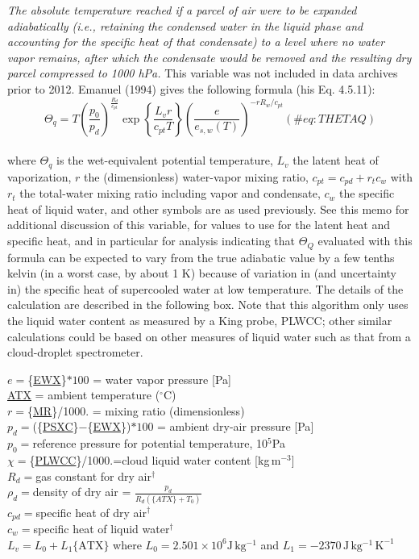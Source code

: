\documentclass[
  english,
]{book}
\begin{document}
\emph{The absolute temperature reached if a parcel of air were to be
expanded adiabatically (i.e., retaining the condensed water in the
liquid phase and accounting for the specific heat of that condensate) to
a level where no water vapor remains, after which the condensate would
be removed and the resulting dry parcel compressed to 1000 hPa.} This
variable was not included in data archives prior to 2012. Emanuel (1994)
gives the following formula (his Eq. 4.5.11):\\
\begin{equation}
\Theta_{q}=T(\frac{p_{0}}{p_{d}})^{\frac{R_{d}}{c_{pt}}}\exp\left\{ \frac{L_{v}r}{c_{pt}T}\right\} \left(\frac{e}{e_{s,w}(T)}\right)^{-rR_{w}/c_{pt}}
(\#eq:THETAQ)
\end{equation}\\
where \(\Theta_q\) is the wet-equivalent potential temperature, \(L_v\)
the latent heat of vaporization, \(r\) the (dimensionless) water-vapor
mixing ratio, \(c_{pt} = c_{pd}+r_tc_w\) with \(r_t\) the total-water
mixing ratio including vapor and condensate, \(c_w\) the specific heat
of liquid water, and other symbols are as used previously. See this memo
for additional discussion of this variable, for values to use for the
latent heat and specific heat, and in particular for analysis indicating
that \(\Theta_Q\) evaluated with this formula can be expected to vary
from the true adiabatic value by a few tenths kelvin (in a worst case,
by about 1 K) because of variation in (and uncertainty in) the specific
heat of supercooled water at low temperature. The details of the
calculation are described in the following box. Note that this algorithm
only uses the liquid water content as measured by a King probe, PLWCC;
other similar calculations could be based on other measures of liquid
water such as that from a cloud-droplet spectrometer.

\(e=\)\{\protect\hyperlink{ewx}{EWX}\}\(*100\) = water vapor pressure
{[}Pa{]}\\
\protect\hyperlink{ambient-t}{ATX} = ambient temperature
(\(^{\circ}\mathrm{C}\))\\
\(r=\)\{\protect\hyperlink{MR}{MR}\}/1000. = mixing ratio
(dimensionless)\\
\(p_{d}=\)(\{\protect\hyperlink{psx}{PSXC}\}\(-\)\{\protect\hyperlink{ewx}{EWX}\})\(*100\)
= ambient dry-air pressure {[}Pa{]}\\
\(p_{0}=\)reference pressure for potential temperature, 10\(^{5}\)Pa\\
\(\chi=\)\{\href{./5-cloud-physics-variables.html\#plwcc}{PLWCC}\}/1000.=cloud
liquid water content {[}kg\(\,\)m\(^{-3}\){]}\\
\(R_{d}=\)gas constant for dry air\(^{\dagger}\)\\
\(\rho_{d}=\)density of dry air =
\(\frac{p_{d}}{R_{d}(\{ATX\}+T_{0})}\)\\
\(c_{pd}=\)specific heat of dry air\(^{\dagger}\)\\
\(c_{w}=\)specific heat of liquid water\(^{\dagger}\)\\
\(L_{v}=L_{0}+L_{1}\mathrm{\{ATX\}}\) where
\(L_{0}=2.501\times10^{6}\mathrm{J}\,\mathrm{kg^{-1}}\) and
\(L_{1}=-2370\,\mathrm{J\,\mathrm{kg^{-1}\,\mathrm{K^{-1}}}}\)
\end{document}
